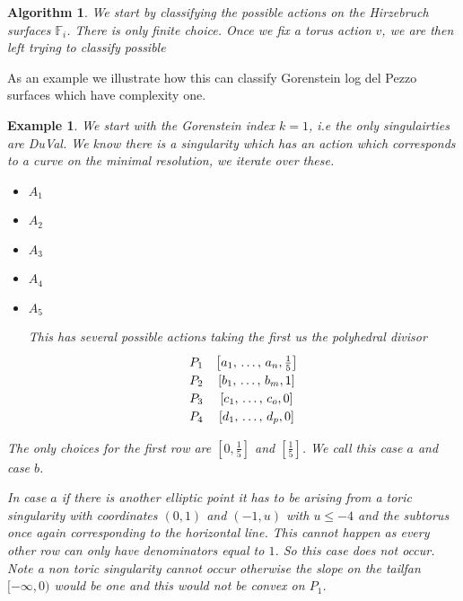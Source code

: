\documentclass[11pt]{amsart}
\theoremstyle{plain}
\newtheorem{ex}[thm]{Example}
\newtheorem{algorithm}[thm]{Algorithm}
\newcommand{\mb}[1]{\mathbb{#1}}
\begin{document}
\begin{algorithm}

We start by classifying the possible actions on the Hirzebruch surfaces $\mb{F}_i$. There is only  finite choice. Once we fix a torus action $v$, we are then left trying to classify possible 
\end{algorithm}


As an example we illustrate how this can classify Gorenstein log del Pezzo surfaces which have complexity one.

\begin{ex}

We start with the Gorenstein index $k = 1$, i.e the only singulairties are DuVal. We know there is a singularity which has an action which corresponds to a curve on the minimal resolution, we iterate over these.
\begin{itemize}

\item  $A_1$

\item $A_2$

\item $A_3$

\item $A_4$

\item $A_5$

This has several possible actions taking the first us the polyhedral divisor 
\[\def\arraystretch{1.2}
\begin{array}{cc}
P_1 & \left[ a_1, \, \dots , \, a_n, \frac{1}{5} \right] \\ 
P_2 & \left[b_1 , \, \dots, \, b_m, 1\right] \\
P_3 & \left[c_1, \, \dots, \, c_o, 0\right] \\
P_4 & \left[d_1, \, \dots, \, d_p, 0\right]  \\
\end{array}
\]
\end{itemize}
The only choices for the first row are $[0, \frac{1}{5}]$ and $[\frac{1}{5}]$. We call this case $a$ and case $b$. 

In case $a$ if there is another elliptic point it has to be arising from a toric singularity with coordinates $(0, 1)$ and $(-1, u)$ with $u \leq -4$ and the subtorus once again corresponding to the horizontal line.
This cannot happen as every other row can only have denominators equal to $1$. So this case does not occur. Note a non toric singularity cannot occur otherwise the slope on the tailfan $[-\infty , 0)$ would be one and this would not be convex on $P_1$.


\end{ex}
\end{document}
